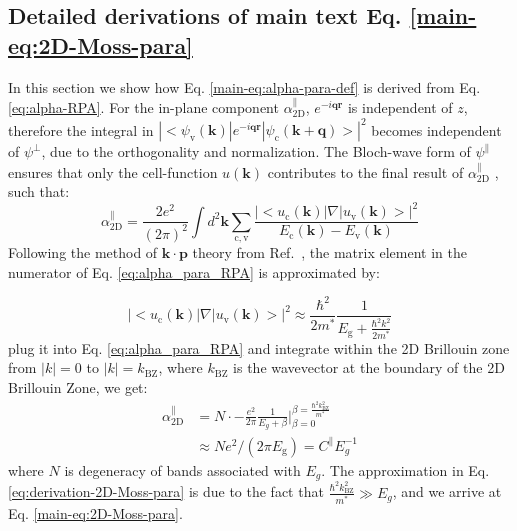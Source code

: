 \documentclass[journal=ancac3,email=true,hyperref=true,keywords=false]{achemso}
\begin{document}


\subsection{Detailed derivations of main text Eq. \ref{main-eq:2D-Moss-para}}  %
\label{ssec:theory-1-para}

In this section we show how Eq. \ref{main-eq:alpha-para-def}
is derived from Eq. \ref{eq:alpha-RPA}. For the in-plane component
$\alpha_{\mathrm{2D}}^{\parallel}$, $e^{-i\mathbf{qr}}$ is independent
of $z$, therefore the integral in
$|<\psi_{\mathrm{v}}(\mathbf{k})|e^{-i\mathbf{q}\mathbf{r}}|\psi_{\mathrm{c}}(\mathbf{k+q})>|^{2}$
becomes independent of $\psi^{\perp}$, due to the orthogonality
and normalization. The Bloch-wave form of $\psi^{\parallel}$ ensures that
only the cell-function $u(\mathbf{k})$ contributes to the final result
of $\alpha^{\parallel}_{\mathrm{2D}}$ \cite{davies_physics_1997}, such
that:
\begin{equation}
  \label{eq:alpha_para_RPA}
  \alpha_{\mathrm{2D}}^{\parallel} = \frac{2e^{2}}
  {(2 \pi)^{2}} \int d^{2}\mathbf{k} \sum_{\mathrm{c, v}}
  \frac{|<u_{\mathrm{c}}(\mathbf{k})|\nabla|u_{\mathrm{v}}(\mathbf{k})>|^{2}}
  {E_{\mathrm{c}}(\mathbf{k}) - E_{\mathrm{v}}(\mathbf{k})}
\end{equation}
Following the method of $\mathbf{k} \cdot \mathbf{p}$ theory from
Ref.~, the matrix element in the numerator
of Eq. \ref{eq:alpha_para_RPA} is approximated by:

\begin{equation}
\label{eq:matrix-approx}
|<u_{\mathrm{c}}(\mathbf{k})|\nabla|u_{\mathrm{v}}(\mathbf{k})>|^{2}
\approx {\displaystyle \frac{\hbar^{2}}{2 m^{*}}
  \frac{1}{E_{\mathrm{g}} + \frac{\hbar^{2} k^{2}}{2 m^{*}}}}
\end{equation}
plug it into Eq. \ref{eq:alpha_para_RPA} and integrate within the 2D Brillouin zone from $|k|=0$ to $|k|= k_{\mathrm{BZ}}$, where $k_{\mathrm{BZ}}$ is the wavevector at the boundary of the 2D Brillouin Zone, we get:
\begin{equation}
  \label{eq:derivation-2D-Moss-para}
  \begin{aligned}
\alpha_{\mathrm{2D}}^{\parallel} &= N\cdot -\frac{e^{2}}{2 \pi}
\frac{1}{E_{g} + \beta} \Biggr\vert_{\beta=0}^{\beta=\frac{\hbar^{2} k^{2}_{\mathrm{BZ}}}{m^{*}}} \\
&\approx N e^{2}/(2\pi E_{\mathrm{g}}) = C^{\parallel} E_{g}^{-1}
\end{aligned}
\end{equation}
where $N$ is degeneracy of bands associated with $E_{g}$. The
approximation in Eq. \ref{eq:derivation-2D-Moss-para} is due to the
fact that $\frac{\hbar^{2} k^{2}_{\mathrm{BZ}}}{m^{*}} \gg E_{g}$, and
we arrive at Eq. \ref{main-eq:2D-Moss-para}.
\end{document}
